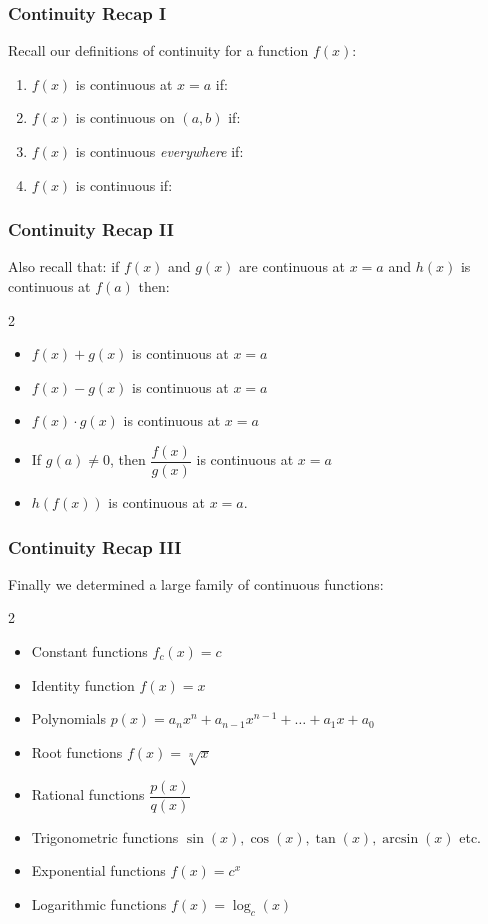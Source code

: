 \documentclass{ltx-talk}
\begin{document}
\begin{frame}
  \frametitle{Continuity Recap I}

  Recall our definitions of continuity for a function $f(x)$:

  \begin{enumerate}
    \item $f(x)$ is continuous at $x = a$ if: \pause
      \vspace{.1in}
    \item $f(x)$ is continuous on $(a,b)$ if: \pause
            \vspace{.1in}
    \item $f(x)$ is continuous \textit{everywhere} if:  \pause
            \vspace{.1in}
    \item $f(x)$ is continuous if: \pause
            \vspace{.1in}
  \end{enumerate} \pause
\end{frame}
\begin{frame}
  \frametitle{Continuity Recap II}
  Also recall that: if $f(x)$ and $g(x)$ are continuous at $x = a$ and $h(x)$ is continuous at $f(a)$ then:
  \begin{multicols}{2}
    \begin{itemize}
      \item $f(x) + g(x)$ is continuous at $x = a$
      \item $f(x) - g(x)$ is continuous at $x = a$
      \item $f(x) \cdot g(x)$ is continuous at $x = a$
      \item If $g(a) \neq 0$, then $\dfrac{f(x)}{g(x)}$ is continuous at $x = a$
      \item $h(f(x))$ is continuous at $x = a$.
    \end{itemize}
  \end{multicols}
\end{frame}

\begin{frame}
  \frametitle{Continuity Recap III}
  Finally we determined a large family of continuous functions:
  \begin{multicols}{2}
    \begin{itemize}
      \item Constant functions $f_c(x) = c$
      \item Identity function $f(x) = x$
      \item Polynomials $p(x) = a_nx^n + a_{n-1}x^{n-1} + \ldots + a_1 x + a_0$
      \item Root functions $f(x) = \sqrt[n]{x}$
      \item Rational functions $\dfrac{p(x)}{q(x)}$
      \item Trigonometric functions $\sin(x), \cos(x), \tan(x), \arcsin(x)$ etc.
      \item Exponential functions $f(x) = c^x$
      \item Logarithmic functions $f(x) = \log_c(x)$
    \end{itemize}
  \end{multicols}
\end{frame}
\end{document}
